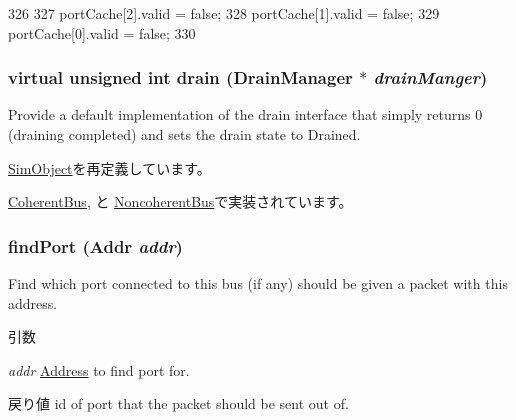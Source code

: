 \begin{DoxyCode}
326                                  {
327         portCache[2].valid = false;
328         portCache[1].valid = false;
329         portCache[0].valid = false;
330     }
\end{DoxyCode}
\hypertarget{classBaseBus_ac8c1510f7e1591e75a5c79b4b873f6b4}{
\subsubsection[{drain}]{\setlength{\rightskip}{0pt plus 5cm}virtual unsigned int drain ({\bf DrainManager} $\ast$ {\em drainManger})}}
\label{classBaseBus_ac8c1510f7e1591e75a5c79b4b873f6b4}
Provide a default implementation of the drain interface that simply returns 0 (draining completed) and sets the drain state to Drained. 

\hyperlink{classSimObject_a6bf479c521c7c3eb473822d953275b26}{SimObject}を再定義しています。

\hyperlink{classCoherentBus_aa8a18d230dba7a674ac8a0b4f35bc36a}{CoherentBus}, と \hyperlink{classNoncoherentBus_aa8a18d230dba7a674ac8a0b4f35bc36a}{NoncoherentBus}で実装されています。\hypertarget{classBaseBus_a16872a256ea6eae168abc47d498841cb}{
\subsubsection[{findPort}]{ findPort ({\bf Addr} {\em addr})}}
\label{classBaseBus_a16872a256ea6eae168abc47d498841cb}
Find which port connected to this bus (if any) should be given a packet with this address. 
\begin{DoxyParams}{引数}
\item[{\em addr}]\hyperlink{classAddress}{Address} to find port for. \end{DoxyParams}
\begin{DoxyReturn}{戻り値}
id of port that the packet should be sent out of. 
\end{DoxyReturn}



